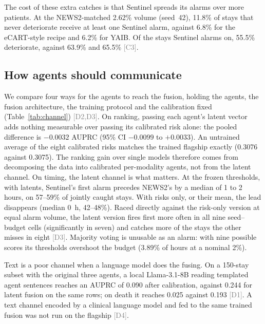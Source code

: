 \documentclass[11pt]{article}
\newcommand{\ev}[1]{\textcolor{gray}{\scriptsize[#1]}}   %
\begin{document}
The cost of these extra catches is that Sentinel spreads its alarms over more
patients. At the NEWS2-matched 2.62\% volume (seed~42), 11.8\% of stays that
never deteriorate receive at least one Sentinel alarm, against 6.8\% for the
eCART-style recipe and 6.2\% for YAIB. Of the stays Sentinel alarms on, 55.5\%
deteriorate, against 63.9\% and 65.5\% \ev{C3}.

\subsection{How agents should communicate}
We compare four ways for the agents to reach the fusion, holding the agents,
the fusion architecture, the training protocol and the calibration fixed
(Table~\ref{tab:channel}) \ev{D2,D3}. On ranking, passing each agent's latent
vector adds nothing measurable over passing its calibrated risk alone: the
pooled difference is $-0.0032$ AUPRC (95\% CI $-0.0099$ to $+0.0033$). An
untrained average of the eight calibrated risks matches the trained flagship
exactly (0.3076 against 0.3075). The ranking gain over single models therefore
comes from decomposing the data into calibrated per-modality agents, not from
the latent channel. On timing, the latent channel is what matters. At the frozen thresholds, with
latents, Sentinel's first alarm precedes NEWS2's by a median of 1 to 2 hours, on 57--59\%
of jointly caught stays. With risks only, or their mean, the lead disappears
(median 0~h, 42--48\%). Raced directly against the risk-only version at equal
alarm volume, the latent version fires first more often in all nine
seed--budget cells (significantly in seven) and catches more of the stays the
other misses in eight \ev{D3}. Majority voting is unusable as an alarm: with nine
possible scores its thresholds overshoot the budget (3.89\% of hours at a
nominal 2\%).

Text is a poor channel when a language model does the fusing. On a 150-stay
subset with the original three agents, a local Llama-3.1-8B reading templated
agent sentences reaches an AUPRC of 0.090 after calibration, against 0.244 for
latent fusion on the same rows; on death it reaches 0.025 against 0.193
\ev{D1}. A text channel encoded by a clinical language model and fed to the same
trained fusion was not run on the flagship \ev{D4}.
\end{document}
